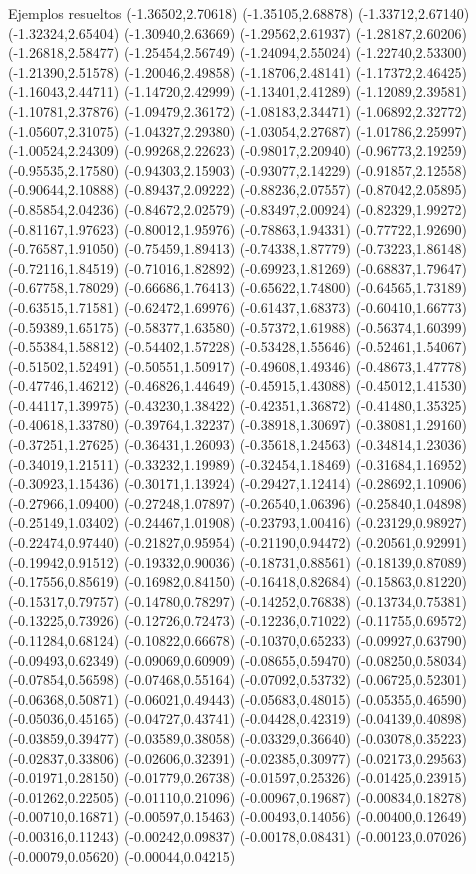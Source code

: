 \documentclass[11pt,a4paper]{article}
\begin{document}
\begin{fmex}{Ejemplos resueltos}
(-1.36502,2.70618) (-1.35105,2.68878) (-1.33712,2.67140) (-1.32324,2.65404) (-1.30940,2.63669) (-1.29562,2.61937) (-1.28187,2.60206) (-1.26818,2.58477) (-1.25454,2.56749) (-1.24094,2.55024) (-1.22740,2.53300) (-1.21390,2.51578) (-1.20046,2.49858) (-1.18706,2.48141) (-1.17372,2.46425) (-1.16043,2.44711) (-1.14720,2.42999) (-1.13401,2.41289) (-1.12089,2.39581) (-1.10781,2.37876) (-1.09479,2.36172) (-1.08183,2.34471) (-1.06892,2.32772) (-1.05607,2.31075) (-1.04327,2.29380) (-1.03054,2.27687) (-1.01786,2.25997) (-1.00524,2.24309) (-0.99268,2.22623) (-0.98017,2.20940) (-0.96773,2.19259) (-0.95535,2.17580) (-0.94303,2.15903) (-0.93077,2.14229) (-0.91857,2.12558) (-0.90644,2.10888) (-0.89437,2.09222) (-0.88236,2.07557) (-0.87042,2.05895) (-0.85854,2.04236) (-0.84672,2.02579) (-0.83497,2.00924) (-0.82329,1.99272) (-0.81167,1.97623) (-0.80012,1.95976) (-0.78863,1.94331) (-0.77722,1.92690) (-0.76587,1.91050) (-0.75459,1.89413) (-0.74338,1.87779) (-0.73223,1.86148) (-0.72116,1.84519) (-0.71016,1.82892) (-0.69923,1.81269) (-0.68837,1.79647) (-0.67758,1.78029) (-0.66686,1.76413) (-0.65622,1.74800) (-0.64565,1.73189) (-0.63515,1.71581) (-0.62472,1.69976) (-0.61437,1.68373) (-0.60410,1.66773) (-0.59389,1.65175) (-0.58377,1.63580) (-0.57372,1.61988) (-0.56374,1.60399) (-0.55384,1.58812) (-0.54402,1.57228) (-0.53428,1.55646) (-0.52461,1.54067) (-0.51502,1.52491) (-0.50551,1.50917) (-0.49608,1.49346) (-0.48673,1.47778) (-0.47746,1.46212) (-0.46826,1.44649) (-0.45915,1.43088) (-0.45012,1.41530) (-0.44117,1.39975) (-0.43230,1.38422) (-0.42351,1.36872) (-0.41480,1.35325) (-0.40618,1.33780) (-0.39764,1.32237) (-0.38918,1.30697) (-0.38081,1.29160) (-0.37251,1.27625) (-0.36431,1.26093) (-0.35618,1.24563) (-0.34814,1.23036) (-0.34019,1.21511) (-0.33232,1.19989) (-0.32454,1.18469) (-0.31684,1.16952) (-0.30923,1.15436) (-0.30171,1.13924) (-0.29427,1.12414) (-0.28692,1.10906) (-0.27966,1.09400) (-0.27248,1.07897) (-0.26540,1.06396) (-0.25840,1.04898) (-0.25149,1.03402) (-0.24467,1.01908) (-0.23793,1.00416) (-0.23129,0.98927) (-0.22474,0.97440) (-0.21827,0.95954) (-0.21190,0.94472) (-0.20561,0.92991) (-0.19942,0.91512) (-0.19332,0.90036) (-0.18731,0.88561) (-0.18139,0.87089) (-0.17556,0.85619) (-0.16982,0.84150) (-0.16418,0.82684) (-0.15863,0.81220) (-0.15317,0.79757) (-0.14780,0.78297) (-0.14252,0.76838) (-0.13734,0.75381) (-0.13225,0.73926) (-0.12726,0.72473) (-0.12236,0.71022) (-0.11755,0.69572) (-0.11284,0.68124) (-0.10822,0.66678) (-0.10370,0.65233) (-0.09927,0.63790) (-0.09493,0.62349) (-0.09069,0.60909) (-0.08655,0.59470) (-0.08250,0.58034) (-0.07854,0.56598) (-0.07468,0.55164) (-0.07092,0.53732) (-0.06725,0.52301) (-0.06368,0.50871) (-0.06021,0.49443) (-0.05683,0.48015) (-0.05355,0.46590) (-0.05036,0.45165) (-0.04727,0.43741) (-0.04428,0.42319) (-0.04139,0.40898) (-0.03859,0.39477) (-0.03589,0.38058) (-0.03329,0.36640) (-0.03078,0.35223) (-0.02837,0.33806) (-0.02606,0.32391) (-0.02385,0.30977) (-0.02173,0.29563) (-0.01971,0.28150) (-0.01779,0.26738) (-0.01597,0.25326) (-0.01425,0.23915) (-0.01262,0.22505) (-0.01110,0.21096) (-0.00967,0.19687) (-0.00834,0.18278) (-0.00710,0.16871) (-0.00597,0.15463) (-0.00493,0.14056) (-0.00400,0.12649) (-0.00316,0.11243) (-0.00242,0.09837) (-0.00178,0.08431) (-0.00123,0.07026) (-0.00079,0.05620) (-0.00044,0.04215) 
\end{fmex}
\end{document}
